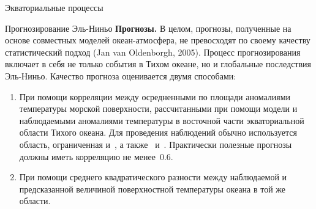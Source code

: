\begin{chapter}{Экваториальные процессы}
\begin{section}{Прогнозирование Эль-Ниньо}
\textbf{Прогнозы.}%
 В целом, прогнозы, полученные на основе
совместных моделей океан-атмосфера, не превосходят по своему качеству
статистический подход (Jan van Oldenborgh, 2005). Процесс прогнозирования
включает в себя не только события в Тихом океане, но и глобальные последствия
Эль-Ниньо. Качество прогноза оценивается двумя способами:
%
\begin{enumerate}
\item
При помощи корреляции между осредненными по площади аномалиями температуры
морской поверхности,
рассчитанными при помощи модели и наблюдаемыми аномалиями температуры
в восточной части экваториальной области Тихого океана. 
Для проведения наблюдений обычно используется область, ограниченная
 и~, а также~ 
и~. Практически полезные прогнозы должны иметь корреляцию
не менее~$0.6$.
%

\item
При помощи среднего квадратического разности между наблюдаемой и предсказанной
величиной поверхностной температуры океана в той же области.
%
\end{enumerate}


\end{section}
\end{chapter}
